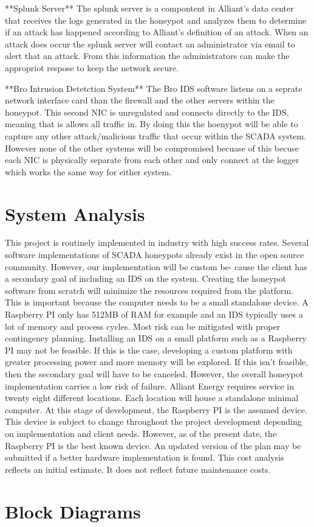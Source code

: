 **Splunk Server**
The splunk server is a compontent in Alliant's data center that receives the logs generated in the honeypot and analyzes them to determine if an attack has happened according to Alliant's definition of an attack.  When an attack does occur the splunk server will contact an administrator via email to alert that an attack.  From this information the administrators can make  the appropriot respose to keep the network secure.

**Bro Intrusion Detetction System**
The Bro IDS software listens on a seprate network interface card than the firewall and the other servers within the honeypot.  This second NIC is unregulated and connects directly to the IDS, meaning that is allows all traffic in.  By doing this the hoenypot will be able to capture any other attack/malicious traffic that occur within the SCADA system.  However none of the other systems will be compromised becuase of this becuse each NIC is physically separate from each other and only connect at the logger which works the same way for either system.  

\section{System Analysis}
This project is routinely implemented in industry with high success rates.
Several software implementations of SCADA honeypots already exist in the
open source community. However, our implementation will be custom be-
cause the client has a secondary goal of including an IDS on the system.
Creating the honeypot software from scratch will minimize the resources required from the platform. This is important because the computer needs to
be a small standalone device. A Raspberry PI only has 512MB of RAM for
example and an IDS typically uses a lot of memory and process cycles. Most
risk can be mitigated with proper contingency planning. Installing an IDS on a small platform such as a Raspberry PI may not be
feasible. If this is the case, developing a custom platform with greater processing power and more memory will be explored. If this isn't feasible, then the secondary goal will have to be canceled. However, the overall honeypot implementation carries a low risk of failure.
\newline
\newline
Alliant Energy requires service in twenty eight different locations. Each location will house a standalone minimal computer. At this stage of development, the Raspberry PI is the assumed device. This device is subject to change throughout the project development depending on implementation and client needs. However, as of the present date, the Raspberry PI is the best known device. An updated version of the plan
may be submitted if a better hardware implementation is found. This cost
analysis reflects an initial estimate. It does not reflect future maintenance costs.

\section{Block Diagrams}

\Blindtext
